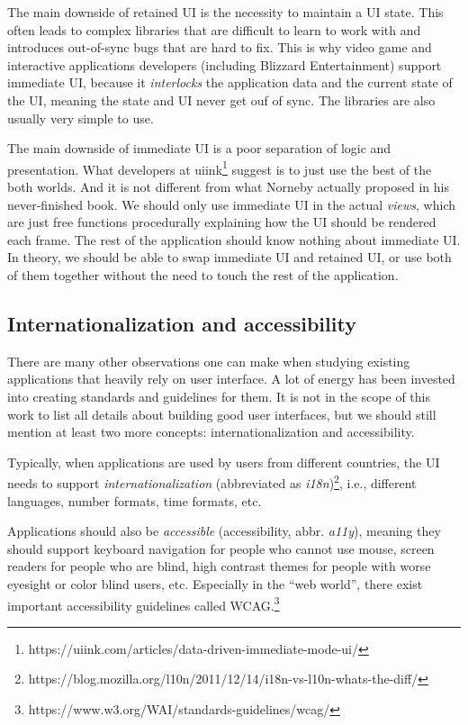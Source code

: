 The main downside of retained UI is the necessity to maintain a UI state.
This often leads to complex libraries that are difficult to learn to work with and introduces out-of-sync bugs that are hard to fix.
This is why video game and interactive applications developers (including Blizzard Entertainment) support immediate UI, because it \emph{interlocks} the application data and the current state of the UI, meaning the state and UI never get ouf of sync.
The libraries are also usually very simple to use.

The main downside of immediate UI is a poor separation of logic and presentation.
What developers at uiink\footnote{https://uiink.com/articles/data-driven-immediate-mode-ui/} suggest is to just use the best of the both worlds.
And it is not different from what Norneby actually proposed in his never-finished book.
We should only use immediate UI in the actual \emph{views}, which are just free functions procedurally explaining how the UI should be rendered each frame.
The rest of the application should know nothing about immediate UI.
In theory, we should be able to swap immediate UI and retained UI, or use both of them together without the need to touch the rest of the application.

\subsection{Internationalization and accessibility}

There are many other observations one can make when studying existing applications that heavily rely on user interface.
A lot of energy has been invested into creating standards and guidelines for them.
It is not in the scope of this work to list all details about building good user interfaces, but we should still mention at least two more concepts: internationalization and accessibility.

Typically, when applications are used by users from different countries, the UI needs to support \emph{internationalization} (abbreviated as \emph{i18n})\footnote{https://blog.mozilla.org/l10n/2011/12/14/i18n-vs-l10n-whats-the-diff/}, i.e., different languages, number formats, time formats, etc.

Applications should also be \emph{accessible} (accessibility, abbr. \emph{a11y}), meaning they should support keyboard navigation for people who cannot use mouse, screen readers for people who are blind, high contrast themes for people with worse eyesight or color blind users, etc.
Especially in the ``web world'', there exist important accessibility guidelines called WCAG.\footnote{https://www.w3.org/WAI/standards-guidelines/wcag/}

